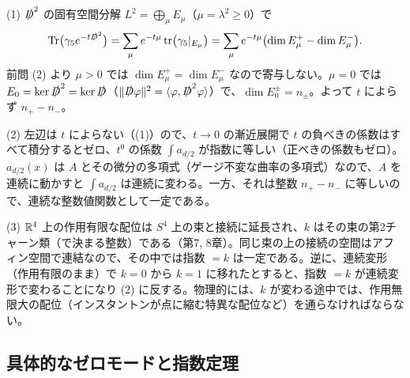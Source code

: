 \begin{solution}
(1) $\slashed D^2$ の固有空間分解 $L^2=\bigoplus_{\mu}E_\mu$（$\mu=\lambda^2\ge0$）で
\[
\operatorname{Tr}\bigl(\gamma_5e^{-t\slashed D^2}\bigr)=\sum_\mu e^{-t\mu}\operatorname{tr}\bigl(\gamma_5|_{E_\mu}\bigr)=\sum_\mu e^{-t\mu}\bigl(\dim E_\mu^+-\dim E_\mu^-\bigr).
\]
前問 (2) より $\mu>0$ では $\dim E^+_\mu=\dim E^-_\mu$ なので寄与しない。$\mu=0$ では $E_0=\ker\slashed D^2=\ker\slashed D$（$\lVert\slashed D\varphi\rVert^2=\langle\varphi,\slashed D^2\varphi\rangle$）で、$\dim E_0^\pm=n_\pm$。よって $t$ によらず $n_+-n_-$。

(2) 左辺は $t$ によらない（(1)）ので、$t\to0$ の漸近展開で $t$ の負べきの係数はすべて積分するとゼロ、$t^0$ の係数 $\int a_{d/2}$ が指数に等しい（正べきの係数もゼロ）。$a_{d/2}(x)$ は $A$ とその微分の多項式（ゲージ不変な曲率の多項式）なので、$A$ を連続に動かすと $\int a_{d/2}$ は連続に変わる。一方、それは整数 $n_+-n_-$ に等しいので、連続な整数値関数として一定である。

(3) $\mathbb{R}^4$ 上の作用有限な配位は $S^4$ 上の束と接続に延長され、$k$ はその束の第2チャーン類（で決まる整数）である（第7, 8章）。同じ束の上の接続の空間はアフィン空間で連結なので、その中では指数 $=k$ は一定である。逆に、連続変形（作用有限のまま）で $k=0$ から $k=1$ に移れたとすると、指数 $=k$ が連続変形で変わることになり (2) に反する。物理的には、$k$ が変わる途中では、作用無限大の配位（インスタントンが点に縮む特異な配位など）を通らなければならない。
\end{solution}

\subsection{具体的なゼロモードと指数定理}

